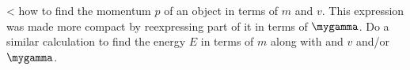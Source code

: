 <%
how to find the momentum $p$ of an object in terms of $m$ and $v$. This expression
was made more compact by reexpressing part of it in terms of $\mygamma$. Do a similar
calculation to find the energy $E$ in terms of $m$ along with and $v$ and/or $\mygamma$.

